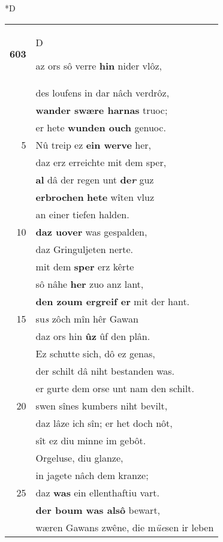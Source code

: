 \documentclass[8pt,a4paper,notitlepage]{article}
\begin{document}
\begin{table}[ht]
\begin{minipage}[t]{0.5\linewidth}
\small
\begin{center}*D
\end{center}
\begin{tabular}{rl}
\textbf{603} & \begin{large}D\end{large}az ors sô verre \textbf{hin} nider vlôz,\\ 
 & des loufens in dar nâch verdrôz,\\ 
 & \textbf{wande}\textbf{r swære harnas} truoc;\\ 
 & er hete \textbf{wunden ouch} genuoc.\\ 
5 & Nû treip ez \textbf{ein werve} her,\\ 
 & daz erz erreichte mit dem sper,\\ 
 & \textbf{al} dâ der regen unt \textbf{de\textit{r}} guz\\ 
 & \textbf{erbrochen} \textbf{hete} wîten vluz\\ 
 & an einer tiefen halden.\\ 
10 & \textbf{daz uover} was gespalden,\\ 
 & daz Gringuljeten nerte.\\ 
 & mit dem \textbf{sper} erz kêrte\\ 
 & sô nâhe \textbf{her} zuo anz lant,\\ 
 & \textbf{den zoum ergreif er} mit der hant.\\ 
15 & su\textit{s} zôch mîn hêr Gawan\\ 
 & daz ors hin \textbf{ûz} ûf den plân.\\ 
 & Ez schutte sich, dô ez genas,\\ 
 & der schilt dâ niht bestanden was.\\ 
 & er gurte dem orse unt nam den schilt.\\ 
20 & swen sînes kumbers niht bevilt,\\ 
 & daz lâze ich sîn; er het doch nôt,\\ 
 & sît ez diu minne im gebôt.\\ 
 & Orgeluse, diu glanze,\\ 
 & in jagete nâch dem kranze;\\ 
25 & daz \textbf{was} ein ellenthaftiu vart.\\ 
 & \textbf{der boum was alsô} bewart,\\ 
 & wæren Gawans zwêne, die m\textit{üe}sen ir leben\\ 

\end{tabular}
\end{minipage}
\end{table}
\end{document}
